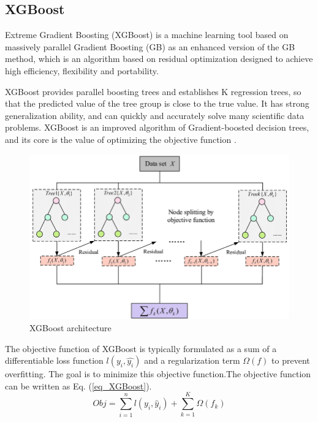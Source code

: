 \documentclass[conference]{IEEEtran}
\begin{document}
\subsection{XGBoost}
Extreme Gradient Boosting (XGBoost) is a machine learning tool based on massively parallel Gradient Boosting (GB) as an enhanced version of the GB method, which is an algorithm based on residual optimization designed to achieve high efficiency, flexibility and portability.\par
XGBoost provides parallel boosting trees and establishes K regression trees, so that the predicted value of the tree group is close to the true value. It has strong generalization ability, and can quickly and accurately solve many scientific data problems. XGBoost is an improved algorithm of Gradient-boosted decision trees, and its core is the value of optimizing the objective function \cite{b12}.\par
\begin{figure}[H]
    \centering
    \begin{minipage}{0.45\textwidth}
    \centering
    \includegraphics[width=1\textwidth]{figures/method/XGBoost_architecture.png}
    \caption{XGBoost architecture}
    \label{fig_XGBoost_architecture}
    \end{minipage}
\end{figure}
The objective function of XGBoost is typically formulated as a sum of a differentiable loss function \(l(y_i,\hat{y_i})\) and a regularization term \(\Omega(f)\) to prevent overfitting. The goal is to minimize this objective function.The objective function can be written as Eq. (\ref{eq_XGBoost}).
\begin{equation}\label{eq_XGBoost}
    Obj = \sum_{i=1}^{n} l(y_i, \hat{y}_i) + \sum_{k=1}^{K} \Omega(f_k)
\end{equation}\par
\end{document}
